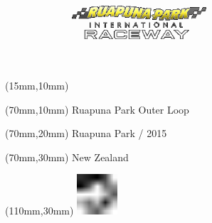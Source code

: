 \null\newpage
\begin{textblock*}{50mm}(15mm,10mm)%
\includegraphics[width=50mm]{LG/RUA.png}
\end{textblock*}
\begin{textblock*}{130mm}(70mm,10mm)%
{\fontsize{20}{20}\selectfont Ruapuna Park Outer Loop}\\
\end{textblock*}
\begin{textblock*}{120mm}(70mm,20mm)%
{\fontsize{16}{16}\selectfont Ruapuna Park / 2015}\\
\end{textblock*}
\begin{textblock*}{120mm}(70mm,30mm)%
{\fontsize{12}{12}\selectfont New Zealand}
\end{textblock*}
\begin{textblock*}{30mm}(110mm,30mm)%
\centering
\includegraphics[height=15mm]{icons/fa-rotate-left.pdf}
\end{textblock*}
